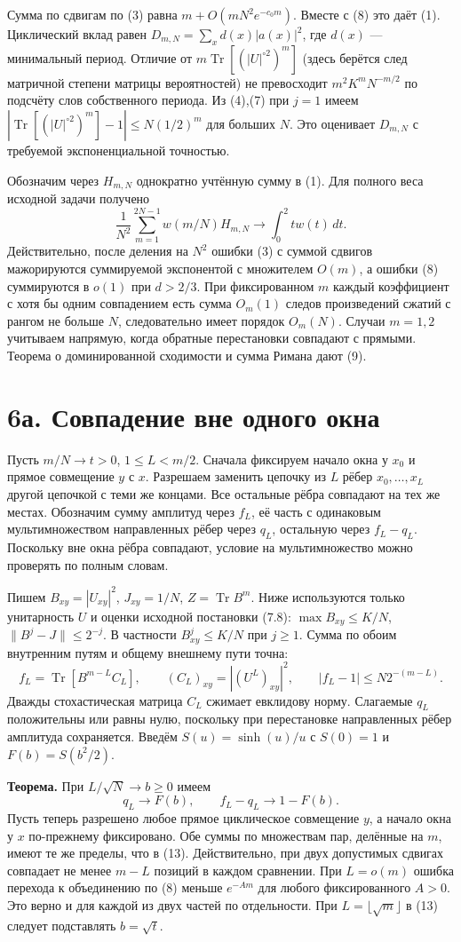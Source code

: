 \documentclass[11pt,a4paper]{article}
\newcommand{\Tr}{\operatorname{Tr}}
\newcommand{\sect}[1]{\section*{\sffamily\color{ink}#1}}
\begin{document}
Сумма по сдвигам по (3) равна $m+O(mN^2 e^{-c_0m})$. Вместе с (8) это даёт (1). Циклический вклад равен $D_{m,N}=\sum_x d(x)|a(x)|^2$, где $d(x)$ --- минимальный период. Отличие от $m\Tr[(|U|^{\circ2})^m]$ (здесь берётся след матричной степени матрицы вероятностей) не превосходит $m^2K^mN^{-m/2}$ по подсчёту слов собственного периода. Из (4),(7) при $j=1$ имеем $|\Tr[(|U|^{\circ2})^m]-1|\le N(1/2)^m$ для больших $N$. Это оценивает $D_{m,N}$ с требуемой экспоненциальной точностью.

Обозначим через $H_{m,N}$ однократно учтённую сумму в (1). Для полного веса исходной задачи получено
\[
 \frac1{N^2}\sum_{m=1}^{2N-1} w(m/N)H_{m,N}\longrightarrow
                         \int_0^2 t w(t)\,dt.                              \tag{9}
\]
Действительно, после деления на $N^2$ ошибки (3) с суммой сдвигов мажорируются суммируемой экспонентой с множителем $O(m)$, а ошибки (8) суммируются в $o(1)$ при $d>2/3$. При фиксированном $m$ каждый коэффициент с хотя бы одним совпадением есть сумма $O_m(1)$ следов произведений сжатий с рангом не больше $N$, следовательно имеет порядок $O_m(N)$. Случаи $m=1,2$ учитываем напрямую, когда обратные перестановки совпадают с прямыми. Теорема о доминированной сходимости и сумма Римана дают (9).
\newpage
\sect{6а. Совпадение вне одного окна}
Пусть $m/N\to t>0$, $1\le L<m/2$. Сначала фиксируем начало окна у $x_0$ и прямое совмещение $y$ с $x$. Разрешаем заменить цепочку из $L$ рёбер $x_0,\ldots,x_L$ другой цепочкой с теми же концами. Все остальные рёбра совпадают на тех же местах. Обозначим сумму амплитуд через $f_L$, её часть с одинаковым мультимножеством направленных рёбер через $q_L$, остальную через $f_L-q_L$. Поскольку вне окна рёбра совпадают, условие на мультимножество можно проверять по полным словам.

Пишем $B_{xy}=|U_{xy}|^2$, $J_{xy}=1/N$, $Z=\Tr B^m$. Ниже используются только унитарность $U$ и оценки исходной постановки (7.8): $\max B_{xy}\le K/N$, $\|B^j-J\|\le2^{-j}$. В частности $B^j_{xy}\le K/N$ при $j\ge1$. Сумма по обоим внутренним путям и общему внешнему пути точна:
\[
 f_L=\Tr[B^{m-L} C_L],\qquad (C_L)_{xy}=|(U^L)_{xy}|^2,\qquad
 |f_L-1|\le N2^{-(m-L)}.                                                    \tag{12}
\]
Дважды стохастическая матрица $C_L$ сжимает евклидову норму. Слагаемые $q_L$ положительны или равны нулю, поскольку при перестановке направленных рёбер амплитуда сохраняется. Введём $S(u)=\sinh(u)/u$ с $S(0)=1$ и $F(b)=S(b^2/2)$.

\textbf{Теорема.} При $L/\sqrt N\to b\ge0$ имеем
\[
                q_L\longrightarrow F(b),\qquad f_L-q_L\longrightarrow1-F(b).
                                                                            \tag{13}
\]
Пусть теперь разрешено любое прямое циклическое совмещение $y$, а начало окна у $x$ по-прежнему фиксировано. Обе суммы по множествам пар, делённые на $m$, имеют те же пределы, что в (13). Действительно, при двух допустимых сдвигах совпадает не менее $m-L$ позиций в каждом сравнении. При $L=o(m)$ ошибка перехода к объединению по (8) меньше $e^{-A m}$ для любого фиксированного $A>0$. Это верно и для каждой из двух частей по отдельности. При $L=\lfloor\sqrt m\rfloor$ в (13) следует подставлять $b=\sqrt t$.
\end{document}
